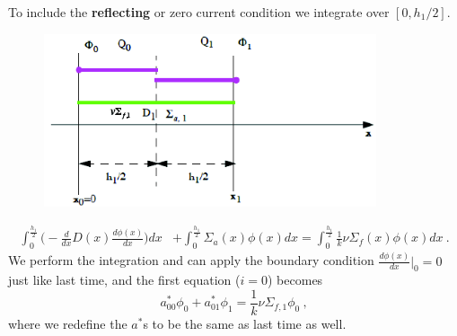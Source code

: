 \documentclass[12pt]{article}
\begin{document}
To include the \textbf{reflecting} or zero current condition we integrate over $[0, h_{1}/2]$.
%
\begin{figure}[h!]
\includegraphics[height=2in]{ReflectingBC-eig}
\end{figure}
%
\begin{align}
\int_{0}^{\frac{h_{1}}{2}} \biggl(-\frac{d}{dx}D(x)\frac{d \phi(x)}{dx}\biggr) dx &+ \int_{0}^{\frac{h_{1}}{2}} \Sigma_a(x) \phi(x) dx = \int_{0}^{\frac{h_{1}}{2}} \frac{1}{k}\nu \Sigma_f(x) \phi(x) dx \:. \nonumber %
%
\end{align}
%
We perform the integration and can apply the boundary condition $\frac{d \phi(x)}{dx}\big|_{0} = 0$ just like last time, 
%
and the first equation ($i=0$) becomes
\[a_{00}^*\phi_0 + a_{01}^* \phi_1 = \frac{1}{k}\nu\Sigma_{f,1} \phi_0 \:,\]
%
where we redefine the $a^*$s to be the same as last time as well.%
%
\end{document}

